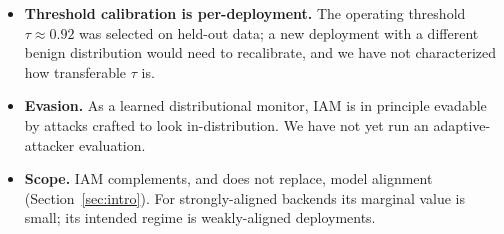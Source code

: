 \begin{itemize}[leftmargin=1.4em,itemsep=0.2em]
        canonicalization makes one model framework-agnostic and observe transfer
        qualitatively, but we have not measured the train-on-A / test-on-B
        prevention drop.
  \item \textbf{Threshold calibration is per-deployment.} The operating
        threshold $\tau\approx 0.92$ was selected on held-out data; a new
        deployment with a different benign distribution would need to
        recalibrate, and we have not characterized how transferable $\tau$ is.
  \item \textbf{Evasion.} As a learned distributional monitor, IAM is in
        principle evadable by attacks crafted to look in-distribution. We have
        not yet run an adaptive-attacker evaluation.
  \item \textbf{Scope.} IAM complements, and does not replace, model
        alignment (Section~\ref{sec:intro}). For strongly-aligned backends its
        marginal value is small; its intended regime is weakly-aligned
        deployments.
\end{itemize}
